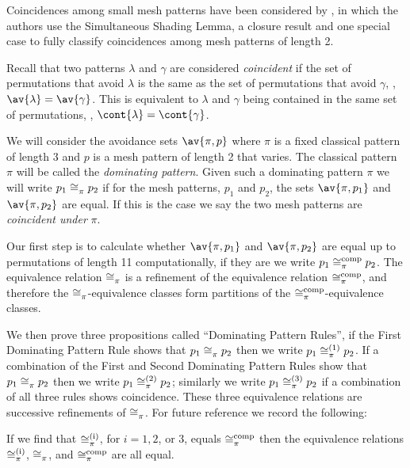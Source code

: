 Coincidences among small mesh patterns have been considered by
\textcite{DBLP:journals/corr/ClaessonTU14}, in which the authors use the
Simultaneous Shading Lemma, a closure result and one special case to fully
classify coincidences among mesh patterns of length 2.

Recall that two patterns \(\lambda\) and \(\gamma\) are considered
\emph{coincident} if the set of permutations that avoid \(\lambda\) is the same
as the set of permutations that avoid \(\gamma\), \ie, \(\av{\lambda} =
\av{\gamma}\). This is equivalent to \(\lambda\) and \(\gamma\) being contained
in the same set of permutations, \ie, \(\cont{\lambda} = \cont{\gamma}\).

We will consider the avoidance sets \(\av{\pi,p}\) where \(\pi\) is a fixed
classical pattern of length 3 and \(p\) is a mesh pattern of length 2 that
varies. The classical pattern \(\pi\) will be called the \emph{dominating
pattern}. Given such a dominating pattern \(\pi\) we will write \(p_1
\coinc{\pi} p_2\) if for the mesh patterns, \(p_1\) and \(p_2\),  the sets
\(\av{\pi,p_1}\) and \(\av{\pi,p_2}\) are equal. If this is the case we say
the two mesh patterns are \emph{coincident under} \(\pi\).

Our first step is to calculate whether \(\av{\pi,p_1}\) and \(\av{\pi,p_2}\) are
equal up to permutations of length 11 computationally, if they are we write
\(p_1 \coinc[comp]{\pi} p_2\). The equivalence relation \(\coinc{\pi}\) is a
refinement of the equivalence relation \(\coinc[comp]{\pi}\), and therefore the
\(\coinc{\pi}\)-equivalence classes form partitions of the
\(\coinc[comp]{\pi}\)-equivalence classes.

We then prove three propositions called ``Dominating Pattern Rules'', if the
First Dominating Pattern Rule shows that \(p_1 \coinc{\pi} p_2\) then we write
\(p_1 \coinc[(1)]{\pi} p_2\). If a combination of the First and Second
Dominating Pattern Rules show that \(p_1 \coinc{\pi} p_2\) then we write
\(p_1 \coinc[(2)]{\pi} p_2\); similarly we write \(p_1 \coinc[(3)]{\pi} p_2\) if
a combination of all three rules shows coincidence. These three equivalence
relations are successive refinements of \(\coinc{\pi}\). For future reference
we record the following:

\begin{note}
\label{note:main}
    If we find that \(\coinc[(i)]{\pi}\), for \(i = 1, 2\), or \(3\), equals
    \(\coinc[comp]{\pi}\) then the equivalence relations \(\coinc[(i)]{\pi}\),
    \(\coinc{\pi}\), and \(\coinc[comp]{\pi}\) are all equal.
\end{note}

